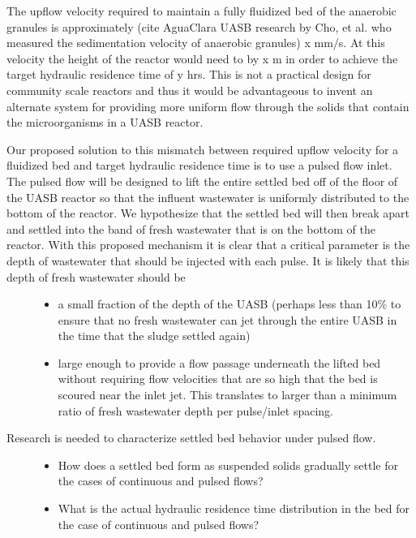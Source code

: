 \documentclass[letterpaper,10pt,english]{sphinxmanual}
\begin{document}
The upflow velocity required to maintain a fully fluidized bed of the anaerobic granules is approximately (cite AguaClara UASB research by Cho, et al. who measured the sedimentation velocity of anaerobic granules) x mm/s. At this velocity the height of the reactor would need to by x m in order to achieve the target hydraulic residence time of y hrs. This is not a practical design for community scale reactors and thus it would be advantageous to invent an alternate system for providing more uniform flow through the solids that contain the microorganisms in a UASB reactor.
\begin{description}
\item[{Our proposed solution to this mismatch between required upflow velocity for a fluidized bed and target hydraulic residence time is to use a pulsed flow inlet. The pulsed flow will be designed to lift the entire settled bed off of the floor of the UASB reactor so that the influent wastewater is uniformly distributed to the bottom of the reactor. We hypothesize that the settled bed will then break apart and settled into the band of fresh wastewater that is on the bottom of the reactor. With this proposed mechanism it is clear that a critical parameter is the depth of wastewater that should be injected with each pulse. It is likely that this depth of fresh wastewater should be}] \leavevmode\begin{itemize}
\item {} 
a small fraction of the depth of the UASB (perhaps less than 10\% to ensure that no fresh wastewater can jet through the entire UASB in the time that the sludge settled again)

\item {} 
large enough to provide a flow passage underneath the lifted bed without requiring flow velocities that are so high that the bed is scoured near the inlet jet. This translates to larger than a minimum ratio of fresh wastewater depth per pulse/inlet spacing.

\end{itemize}

\item[{Research is needed to characterize settled bed behavior under pulsed flow.}] \leavevmode\begin{itemize}
\item {} 
How does a settled bed form as suspended solids gradually settle for the cases of continuous and pulsed flows?

\item {} 
What is the actual hydraulic residence time distribution in the bed for the case of continuous and pulsed flows?


\end{itemize}
\end{description}
\end{document}
